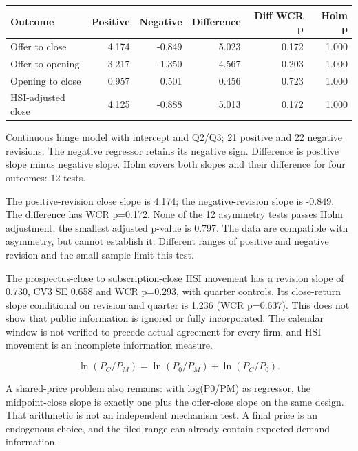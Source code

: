 \documentclass[10pt,a4paper]{article}
\begin{document}
{\small\renewcommand{\arraystretch}{1.10}\begin{tabularx}{\textwidth}{@{}Xrrrrr@{}}\toprule

\textbf{Outcome} & \textbf{Positive} & \textbf{Negative} & \textbf{Difference} & \textbf{Diff WCR p} & \textbf{Holm p} \\\midrule

Offer to close & 4.174 & -0.849 & 5.023 & 0.172 & 1.000 \\

Offer to opening & 3.217 & -1.350 & 4.567 & 0.203 & 1.000 \\

Opening to close & 0.957 & 0.501 & 0.456 & 0.723 & 1.000 \\

HSI-adjusted close & 4.125 & -0.888 & 5.013 & 0.172 & 1.000 \\

\bottomrule\end{tabularx}}\par

{\footnotesize Continuous hinge model with intercept and Q2/Q3; 21 positive and 22 negative revisions. The negative regressor retains its negative sign. Difference is positive slope minus negative slope. Holm covers both slopes and their difference for four outcomes: 12 tests.}\par

The positive-revision close slope is 4.174; the negative-revision slope is -0.849. The difference has WCR p=0.172. None of the 12 asymmetry tests passes Holm adjustment; the smallest adjusted p-value is 0.797. The data are compatible with asymmetry, but cannot establish it. Different ranges of positive and negative revision and the small sample limit this test.

The prospectus-close to subscription-close HSI movement has a revision slope of 0.730, CV3 SE 0.658 and WCR p=0.293, with quarter controls. Its close-return slope conditional on revision and quarter is 1.236 (WCR p=0.637). This does not show that public information is ignored or fully incorporated. The calendar window is not verified to precede actual agreement for every firm, and HSI movement is an incomplete information measure.

\[
\ln(P_C/P_M)=\ln(P_0/P_M)+\ln(P_C/P_0).
\]

A shared-price problem also remains: with log(P0/PM) as regressor, the midpoint-close slope is exactly one plus the offer-close slope on the same design. That arithmetic is not an independent mechanism test. A final price is an endogenous choice, and the filed range can already contain expected demand information.
\end{document}
